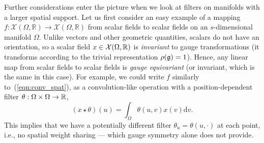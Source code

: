 %

Further considerations enter the picture when we look at filters on manifolds with a larger spatial support. 
%
Let us first consider an easy example %
of a mapping $f : \mathcal{X}(\Omega, \mathbb{R}) \rightarrow \mathcal{X}(\Omega, \mathbb{R})$ from 
scalar fields to scalar fields on an $s$-dimensional manifold $\Omega$. 
Unlike vectors and other geometric quantities, scalars do not have an orientation, so a scalar field $x \in \mathcal{X}(\Omega, \mathbb{R})$ is {\em invariant} to gauge transformations (it transforms according to the trivial representation $\rho({\mathfrak{g}}) = 1$). 
Hence, any linear map from scalar fields to scalar fields is {\em gauge equivariant} (or invariant, which is the same in this case). 
For example, we could write $f$ similarly to~(\ref{eqn:conv_spat}), as a convolution-like operation with a position-dependent filter $\theta : \Omega \times \Omega \rightarrow \mathbb{R}$, %
\begin{equation}
    \label{eq:intro:general-linear-map-scalar-fields}
    (x \star \theta)(u) = \int_{\Omega} \theta(u, v) x(v) \mathrm{d}v.  
\end{equation}
This implies that we have a potentially different filter $\theta_u = \theta(u, \cdot)$ at each point, i.e., no spatial weight sharing --- which gauge symmetry alone does not provide. 


